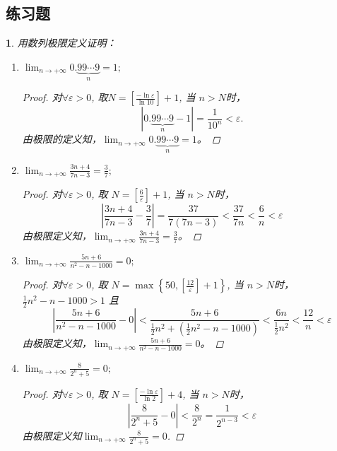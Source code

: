 \documentclass[utf8]{book}
\newtheorem{example}{}[section]             %
\begin{document}
\subsection{练习题}
\begin{example}用数列极限定义证明：
\renewcommand\labelenumi{\normalfont(\theenumi)}
\begin{enumerate}
        \item $\displaystyle \lim_{n\to +\infty} 0.\underbrace{99\cdots9}_{n} = 1;$
        \begin{proof}
        对$\forall \varepsilon > 0$, 取$N = \left [ \frac{-\ln\varepsilon}{\ln 10}\right ] + 1$, 当 $n > N$时，
        $$\left | 0.\underbrace{99\cdots9}_{n} - 1\right | = \frac{1}{10^n} < \varepsilon.$$
        由极限的定义知，$\displaystyle\lim_{n\to +\infty} 0.\underbrace{99\cdots9}_{n} = 1$。
        \end{proof}
        
        \item $\displaystyle \lim_{n\to +\infty}\frac{3n+4}{7n-3} = \frac{3}{7};$
        \begin{proof}
        对$\forall \varepsilon > 0$, 取 $N = \left [ \frac{6}{\varepsilon}\right ] + 1$, 当 $n > N$时，
        $$\left | \frac{3n+4}{7n-3} - \frac{3}{7}\right | = \frac{37}{7(7n-3)} < \frac{37}{7n} < \frac{6}{n} < \varepsilon$$
        由极限定义知，$\displaystyle\lim_{n\to +\infty}\frac{3n+4}{7n-3} = \frac{3}{7}$。
        \end{proof}
        
        \item $\displaystyle \lim_{n\to +\infty}\frac{5n+6}{n^2-n-1000} = 0;$
        \begin{proof}
        对$\forall \varepsilon > 0$, 取 $N = \max\left\{50, \left [ \frac{12}{\varepsilon}\right ] + 1\right\}$, 当 $n > N$时，$\frac{1}{2}n^2 - n - 1000 > 1$ 且
        $$\left|\frac{5n+6}{n^2-n-1000} - 0\right| < \frac{5n + 6}{\frac{1}{2}n^2 + (\frac{1}{2}n^2 - n - 1000)} < \frac{6n}{\frac{1}{2}n^2} < \frac{12}{n} < \varepsilon$$
        由极限定义知，$\displaystyle\lim_{n\to +\infty}\frac{5n+6}{n^2-n-1000} = 0$。  
        \end{proof}
        
        \item $\displaystyle \lim_{n\to +\infty}\frac{8}{2^n+5} = 0;$
        \begin{proof}
         对$\forall \varepsilon > 0$, 取 $N = \left [ \frac{-\ln\varepsilon}{\ln2}\right ] + 4$, 当 $n > N$时，
        $$\left | \frac{8}{2^n+5} - 0\right | < \frac{8}{2^n} = \frac{1}{2^{n-3}} < \varepsilon$$
        由极限定义知$\displaystyle\lim_{n\to +\infty}\frac{8}{2^n+5} = 0$.  
        \end{proof}
        

\end{enumerate}
\end{example}
\end{document}
